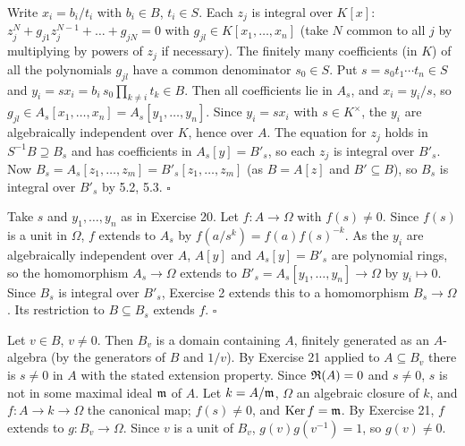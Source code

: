 \documentclass[11pt]{article}
\begin{document}
Write $x_i=b_i/t_i$ with $b_i\in B$, $t_i\in S$. Each $z_j$ is integral over $K[x]$: $z_j^N+g_{j1}z_j^{N-1}+\dots+g_{jN}=0$ with $g_{jl}\in K[x_1,\dots,x_n]$ (take $N$ common to all $j$ by multiplying by powers of $z_j$ if necessary). The finitely many coefficients (in $K$) of all the polynomials $g_{jl}$ have a common denominator $s_0\in S$. Put $s=s_0t_1\cdots t_n\in S$ and $y_i=sx_i=b_i\,s_0\prod_{k\ne i}t_k\in B$. Then all coefficients lie in $A_s$, and $x_i=y_i/s$, so $g_{jl}\in A_s[x_1,\dots,x_n]=A_s[y_1,\dots,y_n]$. Since $y_i=sx_i$ with $s\in K^\times$, the $y_i$ are algebraically independent over $K$, hence over $A$. The equation for $z_j$ holds in $S^{-1}B\supseteq B_s$ and has coefficients in $A_s[y]=B'_s$, so each $z_j$ is integral over $B'_s$. Now $B_s=A_s[z_1,\dots,z_m]=B'_s[z_1,\dots,z_m]$ (as $B=A[z]$ and $B'\subseteq B$), so $B_s$ is integral over $B'_s$ by 5.2, 5.3. \hfill$\square$

\pf
Take $s$ and $y_1,\dots,y_n$ as in Exercise 20. Let $f:A\to\Omega$ with $f(s)\ne0$. Since $f(s)$ is a unit in $\Omega$, $f$ extends to $A_s$ by $f(a/s^k)=f(a)f(s)^{-k}$. As the $y_i$ are algebraically independent over $A$, $A[y]$ and $A_s[y]=B'_s$ are polynomial rings, so the homomorphism $A_s\to\Omega$ extends to $B'_s=A_s[y_1,\dots,y_n]\to\Omega$ by $y_i\mapsto0$. Since $B_s$ is integral over $B'_s$, Exercise 2 extends this to a homomorphism $B_s\to\Omega$. Its restriction to $B\subseteq B_s$ extends $f$. \hfill$\square$

\pf
Let $v\in B$, $v\ne0$. Then $B_v$ is a domain containing $A$, finitely generated as an $A$-algebra (by the generators of $B$ and $1/v$). By Exercise 21 applied to $A\subseteq B_v$ there is $s\ne0$ in $A$ with the stated extension property. Since $\mathfrak R(A)=0$ and $s\ne0$, $s$ is not in some maximal ideal $\mathfrak m$ of $A$. Let $k=A/\mathfrak m$, $\Omega$ an algebraic closure of $k$, and $f:A\to k\to\Omega$ the canonical map; $f(s)\ne0$, and $\operatorname{Ker} f=\mathfrak m$. By Exercise 21, $f$ extends to $g:B_v\to\Omega$. Since $v$ is a unit of $B_v$, $g(v)g(v^{-1})=1$, so $g(v)\ne0$.
\end{document}
